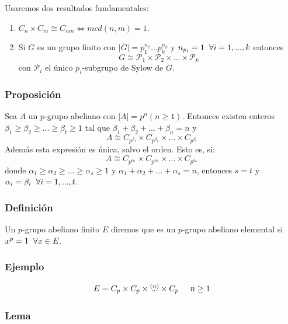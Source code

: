 \documentclass[11pt,a4paper]{article}
\begin{document}
Usaremos dos resultados fundamentales:
\begin{enumerate}[label = (\arabic*)]
\item $C_{n} \times C_{m} \cong C_{nm} \iff mcd(n, m) = 1$.
\item Si $G$ es un grupo finito con $|G| = p_{1}^{n_{1}}...p_{k}^{n_{k}}$ y $n_{p_{i}} = 1 \hspace{0.2cm} \forall i = 1, ..., k$ entonces
$$G \cong \mathcal{P}_{1} \times \mathcal{P}_{2} \times ... \times \mathcal{P}_{k}$$
con $\mathcal{P}_{i}$ el único $p_{i}$-subgrupo de Sylow de $G$.
\end{enumerate}

\subsubsection*{Proposición}

Sea $A$ un $p$-grupo abeliano con $|A| = p^{n} (n \geq 1)$. Entonces existen enteros $\beta_{1} \geq \beta_{2} \geq ... \geq \beta_{t} \geq 1$ tal que $\beta_{1} + \beta_{2} + ... + \beta_{n} = n$ y
$$A \cong C_{p^{\beta_{1}}} \times C_{p^{\beta_{2}}} \times ... \times C_{p^{\beta_{t}}}$$
Además esta expresión es única, salvo el orden. Esto es, si:
$$A \cong C_{p^{\alpha_{1}}} \times C_{p^{\alpha_{2}}} \times ... \times C_{p^{\alpha_{s}}}$$
donde $\alpha_{1} \geq \alpha_{2} \geq ... \geq \alpha_{s} \geq 1$ y $\alpha_{1} + \alpha_{2} + ... + \alpha_{s} = n$, entonces $s = t$ y $\alpha_{i} = \beta_{i} \hspace{0.2cm} \forall i = 1, ..., t$.

\subsubsection*{Definición}

Un $p$-grupo abeliano finito $E$ diremos que es un $p$-grupo abeliano elemental si $x^{p} = 1 \hspace{0.2cm} \forall x \in E$.

\subsubsection*{Ejemplo}

$$E = C_{p} \times C_{p} \times \overset{(n)}{...} \times C_{p} \hspace{0.5cm} n \geq 1$$

\subsubsection*{Lema}
\end{document}
